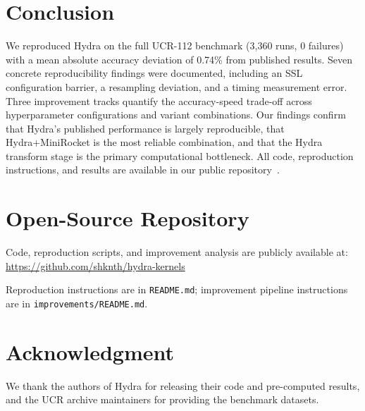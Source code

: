 \documentclass[conference]{IEEEtran}
\begin{document}
\section{Conclusion}

We reproduced Hydra on the full UCR-112 benchmark (3,360 runs, 0 failures)
with a mean absolute accuracy deviation of 0.74\% from published results.
Seven concrete reproducibility findings were documented, including an SSL
configuration barrier, a resampling deviation, and a timing measurement
error. Three improvement tracks quantify the accuracy-speed trade-off across
hyperparameter configurations and variant combinations. Our findings confirm
that Hydra's published performance is largely reproducible, that
Hydra+MiniRocket is the most reliable combination, and that the Hydra
transform stage is the primary computational bottleneck. All code,
reproduction instructions, and results are available in our public
repository~\cite{ourrepo}.

\section*{Open-Source Repository}
\label{sec:repo}

Code, reproduction scripts, and improvement analysis are publicly available
at: \url{https://github.com/shknth/hydra-kernels}

Reproduction instructions are in \texttt{README.md}; improvement pipeline
instructions are in \texttt{improvements/README.md}.

\section*{Acknowledgment}

We thank the authors of Hydra for releasing their code and pre-computed
results, and the UCR archive maintainers for providing the benchmark datasets.
\end{document}
